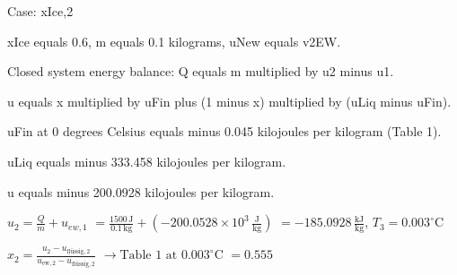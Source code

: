 Case: xIce,2  

xIce equals 0.6, m equals 0.1 kilograms, uNew equals v2EW.  

Closed system energy balance:  
Q equals m multiplied by u2 minus u1.  

u equals x multiplied by uFin plus (1 minus x) multiplied by (uLiq minus uFin).  

uFin at 0 degrees Celsius equals minus 0.045 kilojoules per kilogram (Table 1).  

uLiq equals minus 333.458 kilojoules per kilogram.  

u equals minus 200.0928 kilojoules per kilogram.

\( u_2 = \frac{Q}{m} + u_{ew,1} \)  
\( = \frac{1500 \, \text{J}}{0.1 \, \text{kg}} + (-200.0528 \times 10^3 \, \frac{\text{J}}{\text{kg}}) \)  
\( = -185.0928 \, \frac{\text{kJ}}{\text{kg}} \), \( T_3 = 0.003^\circ \text{C} \)  

\( x_2 = \frac{u_2 - u_{\text{flüssig},2}}{u_{\text{ew},2} - u_{\text{flüssig},2}} \)  
\( \rightarrow \text{Table 1 at } 0.003^\circ \text{C} \)  
\( = 0.555 \)